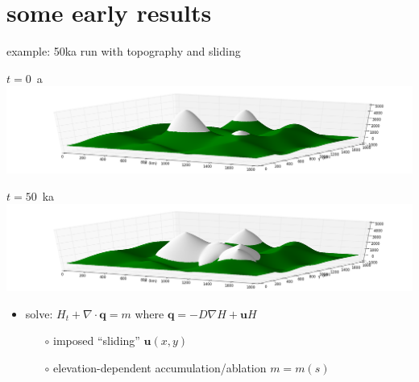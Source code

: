 \documentclass[hide notes,intlimits,usenames,dvipsnames]{beamer}
\newcommand{\Div}{\nabla\cdot}
\newcommand{\grad}{\nabla}
\begin{document}
\section{some early results}

\begin{frame}{example: 50ka run with topography and sliding}
\begin{center}
\mbox{$t=0$ a \includegraphics[height=0.25\textheight]{startsheet.png}}

\mbox{$t=50$ ka \includegraphics[height=0.25\textheight]{endsheet.png}}
\end{center}

\begin{itemize}
\item solve: $H_t + \Div \mathbf{q} = m$ where $\mathbf{q} = -D\grad H + \mathbf{u} H$
    \begin{itemize}
    \item[$\circ$] imposed ``sliding'' $\mathbf{u}(x,y)$
    \item[$\circ$] elevation-dependent accumulation/ablation $m=m(s)$
    \end{itemize}
\end{itemize}
\end{frame}
\end{document}
